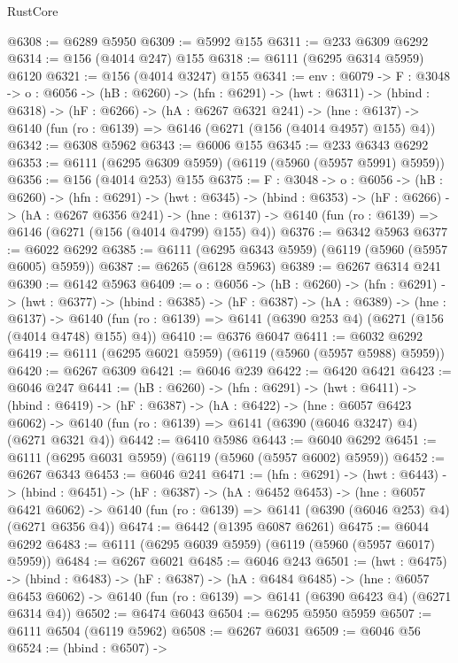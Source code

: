 \begin{lexlean}{RustCore}
\begin{coremodule}
@6308 := @6289 @5950
@6309 := @5992 @155
@6311 := @233 @6309 @6292
@6314 := @156 (@4014 @247) @155
@6318 := @6111 (@6295 @6314 @5959) @6120
@6321 := @156 (@4014 @3247) @155
@6341 := {env : @6079} ->
  {F : @3048} ->
  {o : @6056} ->
  (hB : @6260) ->
  (hfn : @6291) ->
  (hwt : @6311) ->
  (hbind : @6318) ->
  (hF : @6266) ->
  (hA : @6267 @6321 @241) ->
  (hne : @6137) -> @6140 (fun (ro : @6139) => @6146 (@6271 (@156 (@4014 @4957) @155) @4))
@6342 := @6308 @5962
@6343 := @6006 @155
@6345 := @233 @6343 @6292
@6353 := @6111 (@6295 @6309 @5959) (@6119 (@5960 (@5957 @5991) @5959))
@6356 := @156 (@4014 @253) @155
@6375 := {F : @3048} ->
  {o : @6056} ->
  (hB : @6260) ->
  (hfn : @6291) ->
  (hwt : @6345) ->
  (hbind : @6353) ->
  (hF : @6266) ->
  (hA : @6267 @6356 @241) ->
  (hne : @6137) -> @6140 (fun (ro : @6139) => @6146 (@6271 (@156 (@4014 @4799) @155) @4))
@6376 := @6342 @5963
@6377 := @6022 @6292
@6385 := @6111 (@6295 @6343 @5959) (@6119 (@5960 (@5957 @6005) @5959))
@6387 := @6265 (@6128 @5963)
@6389 := @6267 @6314 @241
@6390 := @6142 @5963
@6409 := {o : @6056} ->
  (hB : @6260) ->
  (hfn : @6291) ->
  (hwt : @6377) ->
  (hbind : @6385) ->
  (hF : @6387) ->
  (hA : @6389) ->
  (hne : @6137) ->
  @6140 (fun (ro : @6139) => @6141 (@6390 @253 @4) (@6271 (@156 (@4014 @4748) @155) @4))
@6410 := @6376 @6047
@6411 := @6032 @6292
@6419 := @6111 (@6295 @6021 @5959) (@6119 (@5960 (@5957 @5988) @5959))
@6420 := @6267 @6309
@6421 := @6046 @239
@6422 := @6420 @6421
@6423 := @6046 @247
@6441 := (hB : @6260) ->
  (hfn : @6291) ->
  (hwt : @6411) ->
  (hbind : @6419) ->
  (hF : @6387) ->
  (hA : @6422) ->
  (hne : @6057 @6423 @6062) ->
  @6140 (fun (ro : @6139) => @6141 (@6390 (@6046 @3247) @4) (@6271 @6321 @4))
@6442 := @6410 @5986
@6443 := @6040 @6292
@6451 := @6111 (@6295 @6031 @5959) (@6119 (@5960 (@5957 @6002) @5959))
@6452 := @6267 @6343
@6453 := @6046 @241
@6471 := (hfn : @6291) ->
  (hwt : @6443) ->
  (hbind : @6451) ->
  (hF : @6387) ->
  (hA : @6452 @6453) ->
  (hne : @6057 @6421 @6062) ->
  @6140 (fun (ro : @6139) => @6141 (@6390 (@6046 @253) @4) (@6271 @6356 @4))
@6474 := @6442 (@1395 @6087 @6261)
@6475 := @6044 @6292
@6483 := @6111 (@6295 @6039 @5959) (@6119 (@5960 (@5957 @6017) @5959))
@6484 := @6267 @6021
@6485 := @6046 @243
@6501 := (hwt : @6475) ->
  (hbind : @6483) ->
  (hF : @6387) ->
  (hA : @6484 @6485) ->
  (hne : @6057 @6453 @6062) -> @6140 (fun (ro : @6139) => @6141 (@6390 @6423 @4) (@6271 @6314 @4))
@6502 := @6474 @6043
@6504 := @6295 @5950 @5959
@6507 := @6111 @6504 (@6119 @5962)
@6508 := @6267 @6031
@6509 := @6046 @56
@6524 := (hbind : @6507) ->

\end{coremodule}
\end{lexlean}
